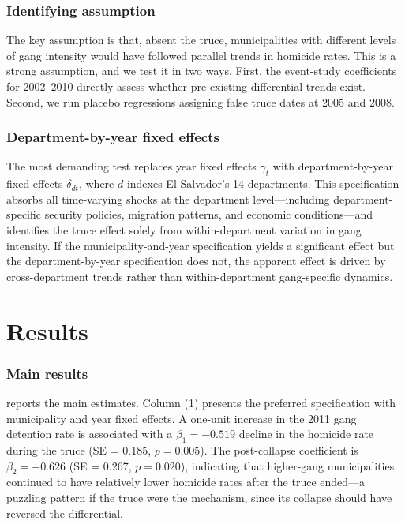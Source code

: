 \documentclass[12pt]{article}
\begin{document}
\subsubsection*{Identifying assumption} The key assumption is that, absent the truce, municipalities with different levels of gang intensity would have followed parallel trends in homicide rates. This is a strong assumption, and we test it in two ways. First, the event-study coefficients for 2002--2010 directly assess whether pre-existing differential trends exist. Second, we run placebo regressions assigning false truce dates at 2005 and 2008.

\subsubsection*{Department-by-year fixed effects} The most demanding test replaces year fixed effects $\gamma_t$ with department-by-year fixed effects $\delta_{dt}$, where $d$ indexes El Salvador's 14 departments. This specification absorbs all time-varying shocks at the department level---including department-specific security policies, migration patterns, and economic conditions---and identifies the truce effect solely from within-department variation in gang intensity. If the municipality-and-year specification yields a significant effect but the department-by-year specification does not, the apparent effect is driven by cross-department trends rather than within-department gang-specific dynamics.


\section{Results}

\subsubsection*{Main results}  reports the main estimates. Column (1) presents the preferred specification with municipality and year fixed effects. A one-unit increase in the 2011 gang detention rate is associated with a $\beta_1 = -0.519$ decline in the homicide rate during the truce (SE = 0.185, $p = 0.005$). The post-collapse coefficient is $\beta_2 = -0.626$ (SE = 0.267, $p = 0.020$), indicating that higher-gang municipalities continued to have relatively lower homicide rates after the truce ended---a puzzling pattern if the truce were the mechanism, since its collapse should have reversed the differential.
\end{document}
